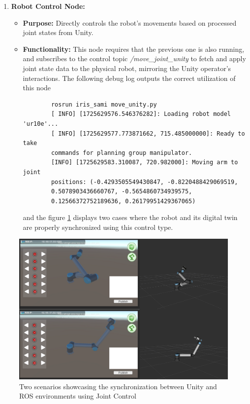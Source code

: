 \begin{enumerate}
    
        
        \item \textbf{Robot Control Node:}
        \begin{itemize}
            \item \textbf{Purpose:} Directly controls the robot's movements based on processed joint states from Unity.
            \item \textbf{Functionality:} This node requires that the previous one is also running, and subscribes to the control topic \textit{/move\_joint\_unity} to fetch and apply joint state data to the physical robot, mirroring the Unity operator’s interactions. The following debug log outputs the correct utilization of this node
    \begin{verbatim}
        rosrun iris_sami move_unity.py 
        [ INFO] [1725629576.546376282]: Loading robot model 'ur10e'...
        [ INFO] [1725629577.773871662, 715.485000000]: Ready to take
        commands for planning group manipulator.
        [INFO] [1725629583.310087, 720.982000]: Moving arm to joint 
        positions: (-0.4293505549430847, -0.8220488429069519,
        0.5078903436660767, -0.5654860734939575,
        0.12566372752189636, 0.26179951429367065)
    \end{verbatim}
    
    and the figure \ref{fig:synchronization-joint-control} displays two cases where the robot and its digital twin are properly synchronized using this control type.
        \end{itemize}
    \end{enumerate}
    
    \begin{figure}[b!]
        \centering
        \includegraphics[width=1\linewidth]{figs/montagem.png}
        \caption{Two scenarios showcasing the synchronization between Unity and ROS environments using Joint Control}
        \label{fig:synchronization-joint-control}
    \end{figure}
    
